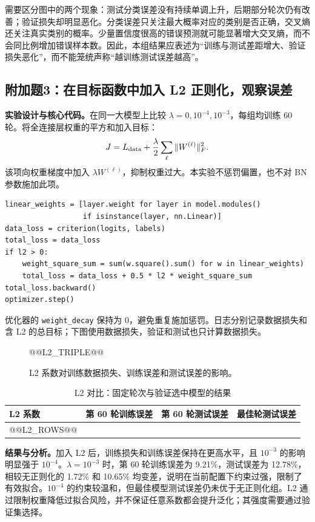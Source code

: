 \documentclass[UTF8,11pt,a4paper,fontset=fandol]{ctexart}
\newcommand{\question}[1]{\Needspace{14\baselineskip}\subsection{#1}}
\begin{document}
需要区分图中的两个现象：测试分类误差没有持续单调上升，后期部分轮次仍有改善；验证损失却明显恶化。分类误差只关注最大概率对应的类别是否正确，交叉熵还关注真实类别的概率。少量置信度很高的错误预测就可能显著增大交叉熵，而不会同比例增加错误样本数。因此，本组结果应表述为“训练与测试差距增大、验证损失恶化”，而不能笼统声称“越训练测试误差越高”。

\question{附加题3：在目标函数中加入 L2 正则化，观察误差}
\textbf{实验设计与核心代码。}在同一大模型上比较 $\lambda=0,10^{-4},10^{-3}$，每组均训练 60 轮。将全连接层权重的平方和加入目标：
\begin{equation}
J=L_{\rm data}+\frac{\lambda}{2}\sum_{\ell}\|W^{(\ell)}\|_F^2.
\end{equation}
该项向权重梯度中加入 $\lambda W^{(\ell)}$，抑制权重过大。本实验不惩罚偏置，也不对 BN 参数施加此项。
\par\noindent\begin{minipage}{\linewidth}
\begin{lstlisting}
linear_weights = [layer.weight for layer in model.modules()
                  if isinstance(layer, nn.Linear)]
data_loss = criterion(logits, labels)
total_loss = data_loss
if l2 > 0:
    weight_square_sum = sum(w.square().sum() for w in linear_weights)
    total_loss = data_loss + 0.5 * l2 * weight_square_sum
total_loss.backward()
optimizer.step()
\end{lstlisting}
\end{minipage}\par
优化器的 \texttt{weight\_decay} 保持为 0，避免重复施加惩罚。日志分别记录数据损失和含 L2 的总目标；下图使用数据损失，验证和测试也只计算数据损失。
\begin{figure}[H]\centering
@@L2_TRIPLE@@
\caption{L2 系数对训练数据损失、训练误差和测试误差的影响。}\label{fig:l2}
\end{figure}
\begin{table}[H]\centering\small
\caption{L2 对比：固定轮次与验证选中模型的结果}
\begin{tabular}{lrrr}\toprule
L2 系数 & 第 60 轮训练误差 & 第 60 轮测试误差 & 最佳轮测试误差 \\\midrule
@@L2_ROWS@@
\bottomrule\end{tabular}
\end{table}
\textbf{结果与分析。}加入 L2 后，训练损失和训练误差保持在更高水平，且 $10^{-3}$ 的影响明显强于 $10^{-4}$。$\lambda=10^{-3}$ 时，第 60 轮训练误差为 9.21\%，测试误差为 12.78\%，相较无正则化的 1.72\% 和 10.65\% 均变差，说明在当前配置下约束过强，限制了有效拟合。$10^{-4}$ 的约束较温和，但最佳模型测试误差仍未优于无正则化组。L2 通过限制权重降低过拟合风险，并不保证任意系数都会提升泛化；其强度需要通过验证集选择。
\end{document}
